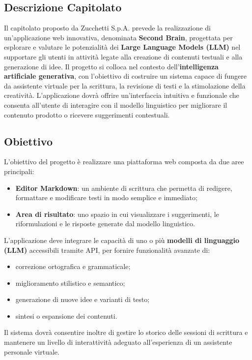 \documentclass[a4paper,12pt]{article}
\begin{document}
{{{    \subsection{Descrizione Capitolato}
        Il capitolato proposto da Zucchetti S.p.A. prevede la realizzazione di un’applicazione web innovativa, denominata \textbf{Second Brain}, progettata per esplorare e valutare le potenzialità dei \textbf{Large Language Models (LLM)} nel supportare gli utenti in attività legate alla creazione di contenuti testuali e alla generazione di idee.
        Il progetto si colloca nel contesto dell’\textbf{intelligenza artificiale generativa}, con l’obiettivo di costruire un sistema capace di fungere da assistente virtuale per la scrittura, la revisione di testi e la stimolazione della creatività.
        L’applicazione dovrà offrire un’interfaccia intuitiva e funzionale che consenta all’utente di interagire con il modello linguistico per migliorare il contenuto prodotto o ricevere suggerimenti contestuali.
    

    \subsection{Obiettivo}
        L’obiettivo del progetto è realizzare una piattaforma web composta da due aree principali:
        \begin{itemize}
            \item \textbf{Editor Markdown}: un ambiente di scrittura che permetta di redigere, formattare e modificare testi in modo semplice e immediato;
            \item \textbf{Area di risultato}: uno spazio in cui visualizzare i suggerimenti, le riformulazioni e le risposte generate dal modello linguistico.
        \end{itemize}
        L’applicazione deve integrare le capacità di uno o più \textbf{modelli di linguaggio (LLM)} accessibili tramite API, per fornire funzionalità avanzate di:
        \begin{itemize}
            \item correzione ortografica e grammaticale;
            \item miglioramento stilistico e semantico;
            \item generazione di nuove idee e varianti di testo;
            \item sintesi o espansione dei contenuti.
        \end{itemize}
        Il sistema dovrà consentire inoltre di gestire lo storico delle sessioni di scrittura e mantenere un livello di interattività adeguato all’esperienza di un assistente personale virtuale.
    

}}}
\end{document}
